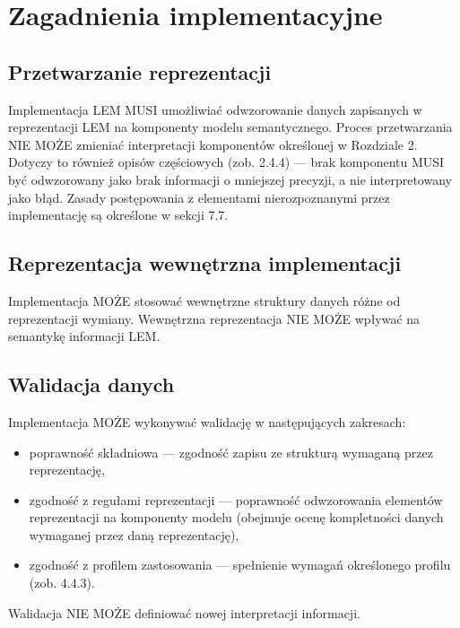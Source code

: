 
\chapter{Zagadnienia implementacyjne}
\label{chap:implementacja}

\section{Przetwarzanie reprezentacji}
Implementacja LEM MUSI umożliwiać odwzorowanie danych zapisanych w reprezentacji LEM na komponenty modelu semantycznego.
Proces przetwarzania NIE MOŻE zmieniać interpretacji komponentów określonej w Rozdziale 2. Dotyczy to również opisów częściowych (zob. 2.4.4) — brak komponentu MUSI być odwzorowany jako brak informacji o mniejszej precyzji, a nie interpretowany jako błąd. Zasady postępowania z elementami nierozpoznanymi przez implementację są określone w sekcji 7.7.

\section{Reprezentacja wewnętrzna implementacji}
Implementacja MOŻE stosować wewnętrzne struktury danych różne od reprezentacji wymiany. Wewnętrzna reprezentacja NIE MOŻE wpływać na semantykę informacji LEM.

\section{Walidacja danych}
Implementacja MOŻE wykonywać walidację w następujących zakresach:

\begin{itemize}
    \item poprawność składniowa — zgodność zapisu ze strukturą wymaganą przez reprezentację,
    \item zgodność z regułami reprezentacji — poprawność odwzorowania elementów reprezentacji na komponenty modelu (obejmuje ocenę kompletności danych wymaganej przez daną reprezentację),
    \item zgodność z profilem zastosowania — spełnienie wymagań określonego profilu (zob. 4.4.3).
\end{itemize}

Walidacja NIE MOŻE definiować nowej interpretacji informacji.

